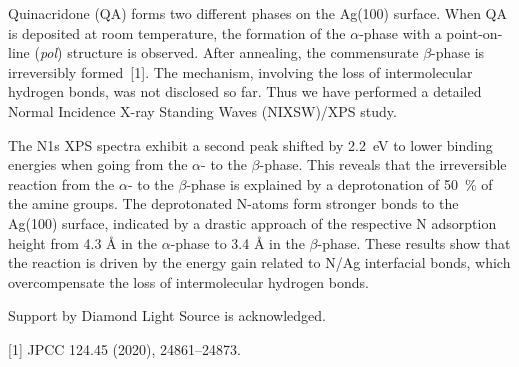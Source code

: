 \documentclass{scdpg}
\begin{document}
\begin{scAbstract}
\scBeginText

Quinacridone (QA) forms two different phases on the Ag(100) surface. When QA is deposited at room temperature, the formation of the $\alpha$-phase with a point-on-line (\textit{pol}) structure is observed. After annealing, the commensurate $\beta$-phase is irreversibly formed~[1]. The mechanism, involving the loss of intermolecular hydrogen bonds, was not disclosed so far. Thus we have performed a detailed Normal Incidence X-ray Standing Waves (NIXSW)/XPS study.

The N1s XPS spectra exhibit a second peak shifted by 2.2~eV to lower binding energies when going from the $\alpha$- to the $\beta$-phase. This reveals that the irreversible reaction from the $\alpha$- to the $\beta$-phase is explained by a deprotonation of 50~\% of the amine groups. The deprotonated N-atoms form stronger bonds to the Ag(100) surface, indicated by a drastic approach of the respective N adsorption height from 4.3 Å in the $\alpha$-phase to 3.4 Å in the $\beta$-phase. These results show that the reaction is driven by the energy gain related to N/Ag interfacial bonds, which overcompensate the loss of intermolecular hydrogen bonds.

Support by Diamond Light Source is acknowledged.

[1] JPCC 124.45 (2020), 24861–24873.


\scEndText
{}
\end{scAbstract}
\end{document}
